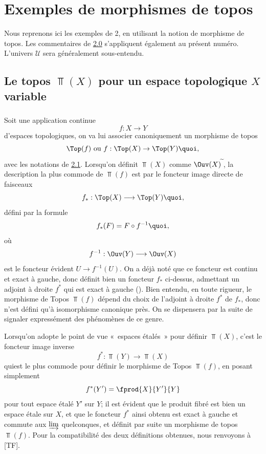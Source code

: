 \documentclass[10pt]{../fichiers-configuration-latex/smfart}
\begin{document}
\section{Exemples de morphismes de topos}

Nous reprenons ici les exemples de 2, en utilisant la notion de
morphisme de topos. Les commentaires de \hyperref[IV.subsec2.0]{2.0}
s'appliquent également au présent numéro. L'univers
$𝒰$ sera généralement sous-entendu.

\subsection{Le topos $\Top(X)$ pour un espace topologique $X$
variable}\pageoriginale

\subsubsection{}
Soit une application continue
$$
f:X\longrightarrow Y
$$
d'espaces topologiques, on va lui associer canoniquement un
morphisme de topos
$$
\Top(f)\mbox{ ou } f:\Top(X)\rightarrow \Top(Y){\quoi},
$$
avec les notations de \hyperref[IV.subsec2.1]{2.1}. Lorsqu'on définit
$\Top(X)$ comme $\Ouv(X)^{\widetilde{\phantom{,}}}$, la description
la plus commode de $\Top(f)$ est par le foncteur image directe de
faisceaux
$$
f_{\ast}:\Top(X)\longrightarrow \Top(Y){\quoi},
$$
défini par la formule
$$
f_{\ast}(F)=F\circ f^{-1}{\quoi},
$$
où
$$
f^{-1}:\Ouv(Y)\longrightarrow \Ouv(X)
$$
est le foncteur évident $U\rightarrow f^{-1}(U)$. On a déjà noté que
ce foncteur est continu et exact à gauche, donc définit bien un
foncteur $f_{\ast}$ ci-dessus, admettant un adjoint à droite
$f^{\ast}$ qui est exact à gauche (). Bien
entendu, en toute rigueur, le morphisme de Topos $\Top(f)$ dépend du
choix de l'adjoint à droite $f^{\ast}$ de $f_{\ast}$, donc n'est
défini qu'à isomorphisme canonique près. On se dispensera par la
suite de signaler expressément des phénomènes de ce genre.

Lorsqu'on adopte le point de vue « espaces étalés »  pour
définir $\Top(X)$, c'est le foncteur image inverse
$$
f^{\ast}:\Top(Y)\longrightarrow \Top(X)
$$
qui\pageoriginale est le plus commode pour définir le morphisme de
Topos $\Top(f)$, en posant simplement
$$
f^{\ast}(Y')=\fprod{X}{Y'}{Y}
$$
pour tout espace étalé $Y'$ sur $Y$; il est évident que le
produit fibré est bien un espace étale sur $X$, et que le
foncteur $f^{\ast}$ ainsi obtenu est exact à gauche et commute aux
$\varinjlim$ quelconques, et définit par suite un morphisme de
topos $\Top(f)$. Pour la compatibilité des deux définitions
obtenues, nous renvoyons à [TF].
\end{document}
